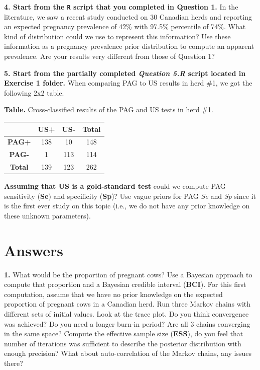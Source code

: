 \documentclass[
]{book}
\begin{document}
\textbf{4. Start from the \texttt{R} script that you completed in Question 1.} In the literature, we saw a recent study conducted on 30 Canadian herds and reporting an expected pregnancy prevalence of 42\% with 97.5\% percentile of 74\%. What kind of distribution could we use to represent this information? Use these information as a pregnancy prevalence prior distribution to compute an apparent prevalence. Are your results very different from those of Question 1?

\textbf{5. Start from the partially completed \emph{Question 5.R} script located in Exercise 1 folder.} When comparing PAG to US results in herd \#1, we got the following 2x2 table.

\textbf{Table.} Cross-classified results of the PAG and US tests in herd \#1.

\begin{longtable}[]{@{}cccc@{}}
\toprule\noalign{}
& \textbf{US+} & \textbf{US-} & \textbf{Total} \\
\midrule\noalign{}
\endhead
\bottomrule\noalign{}
\endlastfoot
\textbf{PAG+} & 138 & 10 & 148 \\
\textbf{PAG-} & 1 & 113 & 114 \\
\textbf{Total} & 139 & 123 & 262 \\
\end{longtable}

\textbf{Assuming that US is a gold-standard test} could we compute PAG sensitivity (\textbf{Se}) and specificity (\textbf{Sp})? Use vague priors for PAG \emph{Se} and \emph{Sp} since it is the first ever study on this topic (i.e., we do not have any prior knowledge on these unknown parameters).

\section{Answers}\label{answers}

\textbf{1.} What would be the proportion of pregnant cows? Use a Bayesian approach to compute that proportion and a Bayesian credible interval (\textbf{BCI}). For this first computation, assume that we have no prior knowledge on the expected proportion of pregnant cows in a Canadian herd. Run three Markov chains with different sets of initial values. Look at the trace plot. Do you think convergence was achieved? Do you need a longer burn-in period? Are all 3 chains converging in the same space? Compute the effective sample size (\textbf{ESS}), do you feel that number of iterations was sufficient to describe the posterior distribution with enough precision? What about auto-correlation of the Markov chains, any issues there?
\end{document}
